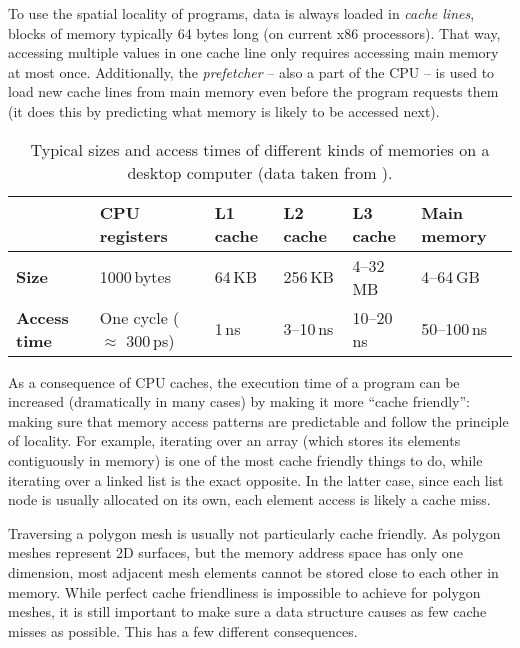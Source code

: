 To use the spatial locality of programs, data is always loaded in \emph{cache lines}, blocks of memory typically 64 bytes long (on current x86 processors).
That way, accessing multiple values in one cache line only requires accessing main memory at most once.
Additionally, the \emph{prefetcher} -- also a part of the CPU -- is used to load new cache lines from main memory even before the program requests them (it does this by predicting what memory is likely to be accessed next).

\vspace{5mm}
\newpage

\begin{table}[t]
  \centering
  \small
  \sffamily
  \begin{tabular}{llllll}
  & \textbf{CPU registers} & \textbf{L1 cache} & \textbf{L2 cache} & \textbf{L3 cache} & \textbf{Main memory} \\\hline
  \textbf{Size} & 1000\,bytes & 64\,KB & 256\,KB & 4--32\,MB & 4--64\,GB \\\hline
  \textbf{Access time} & One cycle ($\approx$ 300\,ps) & 1\,ns & 3--10\,ns & 10--20\,ns & 50--100\,ns \\\hline
  \end{tabular}
  \caption{Typical sizes and access times of different kinds of memories on a desktop computer (data taken from \cite{hennessy2017computer}).}
  \label{tbl:caches}
  \vspace{5mm}
\end{table}

As a consequence of CPU caches, the execution time of a program can be increased (dramatically in many cases) by making it more \enquote{cache friendly}: making sure that memory access patterns are predictable and follow the principle of locality.
For example, iterating over an array (which stores its elements contiguously in memory) is one of the most cache friendly things to do, while iterating over a linked list is the exact opposite.
In the latter case, since each list node is usually allocated on its own, each element access is likely a cache miss.

Traversing a polygon mesh is usually not particularly cache friendly.
As polygon meshes represent 2D surfaces, but the memory address space has only one dimension, most adjacent mesh elements cannot be stored close to each other in memory.
While perfect cache friendliness is impossible to achieve for polygon meshes, it is still important to make sure a data structure causes as few cache misses as possible.
This has a few different consequences.

